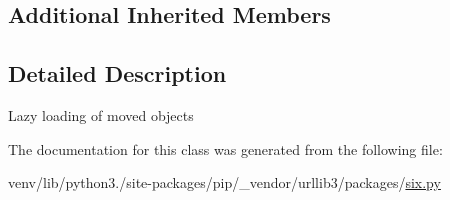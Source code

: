 \subsection*{Additional Inherited Members}


\subsection{Detailed Description}
\begin{DoxyVerb}Lazy loading of moved objects\end{DoxyVerb}
 

The documentation for this class was generated from the following file\+:\begin{DoxyCompactItemize}
\item 
venv/lib/python3./site-\/packages/pip/\+\_\+vendor/urllib3/packages/\hyperlink{pip_2__vendor_2urllib3_2packages_2six_8py}{six.\+py}\end{DoxyCompactItemize}
